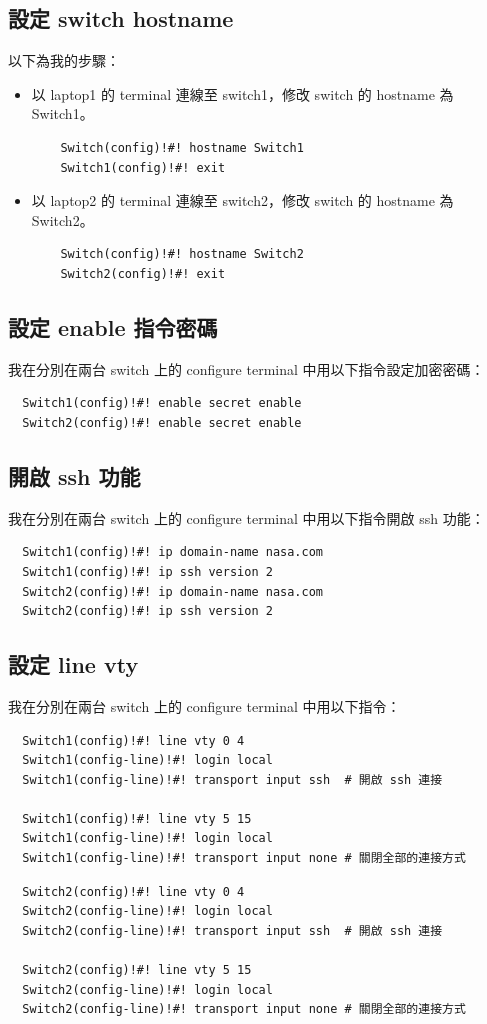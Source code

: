 \documentclass[12pt]{article}
\begin{document}
\subsection{設定 switch hostname}
以下為我的步驟：
\begin{itemize}
  \item 以 laptop1 的 terminal 連線至 switch1，修改 switch 的 hostname 為 Switch1。
  \begin{verbatim}
    Switch(config)!#! hostname Switch1
    Switch1(config)!#! exit
  \end{verbatim}
  \item 以 laptop2 的 terminal 連線至 switch2，修改 switch 的 hostname 為 Switch2。
  \begin{verbatim}
    Switch(config)!#! hostname Switch2
    Switch2(config)!#! exit
  \end{verbatim}
\end{itemize}

\subsection{設定 enable 指令密碼}
我在分別在兩台 switch 上的 configure terminal 中用以下指令設定加密密碼：
\begin{verbatim}
  Switch1(config)!#! enable secret enable
  Switch2(config)!#! enable secret enable
\end{verbatim}

\subsection{開啟 ssh 功能}
我在分別在兩台 switch 上的 configure terminal 中用以下指令開啟 ssh 功能：
\begin{verbatim}
  Switch1(config)!#! ip domain-name nasa.com
  Switch1(config)!#! ip ssh version 2
  Switch2(config)!#! ip domain-name nasa.com
  Switch2(config)!#! ip ssh version 2
\end{verbatim}

\subsection{設定 line vty}
我在分別在兩台 switch 上的 configure terminal 中用以下指令：
\begin{verbatim}
  Switch1(config)!#! line vty 0 4
  Switch1(config-line)!#! login local
  Switch1(config-line)!#! transport input ssh  # 開啟 ssh 連接

  Switch1(config)!#! line vty 5 15
  Switch1(config-line)!#! login local
  Switch1(config-line)!#! transport input none # 關閉全部的連接方式
\end{verbatim}
\vspace{-0.5cm}
\begin{verbatim}
  Switch2(config)!#! line vty 0 4
  Switch2(config-line)!#! login local
  Switch2(config-line)!#! transport input ssh  # 開啟 ssh 連接

  Switch2(config)!#! line vty 5 15
  Switch2(config-line)!#! login local
  Switch2(config-line)!#! transport input none # 關閉全部的連接方式
\end{verbatim}
\end{document}
